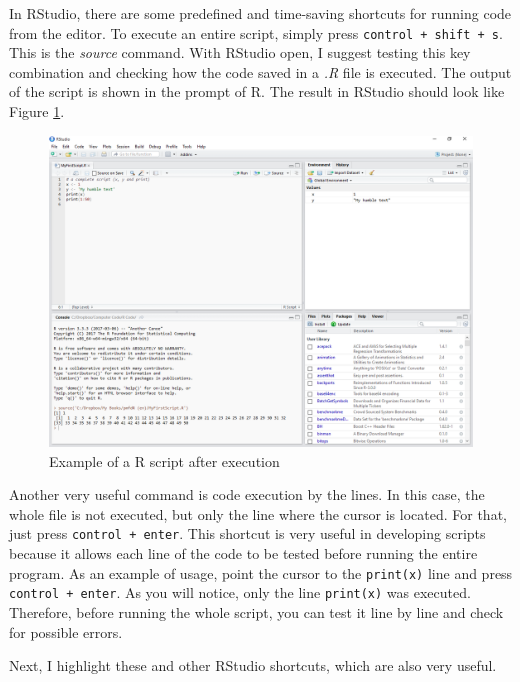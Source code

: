 \documentclass[11pt,]{book}
\begin{document}
In RStudio, there are some predefined and time-saving shortcuts for
running code from the editor. To execute an entire script, simply press
\texttt{control\ +\ shift\ +\ s}. This is the \emph{source} command.
With RStudio open, I suggest testing this key combination and checking
how the code saved in a \emph{.R} file is executed. The output of the
script is shown in the prompt of R. The result in RStudio should look
like Figure \ref{fig:example-script-source}. 

\begin{figure}[!htbp]

{\centering \includegraphics[width=1\linewidth]{figs/RStudio_example_script_source} 

}

\caption{Example of a R script after execution}\label{fig:example-script-source}
\end{figure}

Another very useful command is code execution by the lines. In this
case, the whole file is not executed, but only the line where the cursor
is located. For that, just press \texttt{control\ +\ enter}. This
shortcut is very useful in developing scripts because it allows each
line of the code to be tested before running the entire program. As an
example of usage, point the cursor to the \texttt{print(x)} line and
press \texttt{control\ +\ enter}. As you will notice, only the line
\texttt{print(x)} was executed. Therefore, before running the whole
script, you can test it line by line and check for possible errors.

Next, I highlight these and other RStudio shortcuts, which are also very
useful.
\end{document}

